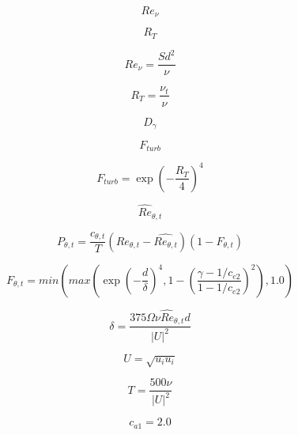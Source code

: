 \begin{equation}
Re_\nu
\end{equation}

\begin{equation}
R_T
\end{equation}

\begin{equation}
Re_\nu  = \frac{S d^2}{\nu}
\end{equation}

\begin{equation}
R_T = \frac{\nu_t}{\nu}
\end{equation}

\begin{equation}
D_\gamma
\end{equation}

\begin{equation}
F_{turb}
\end{equation}

\begin{equation}
F_{turb} = \exp\left(-\frac{R_T}{4}\right)^4
\end{equation}

\begin{equation}
\widehat{Re}_{\theta,t}
\end{equation}

\begin{equation}
P_{\theta,t}  = \frac{c_{\theta,t}}{T} \left( Re_{\theta,t} - \widehat{Re_{\theta,t}} \right) \left(1- F_{\theta,t} \right)
\end{equation}

\begin{equation}
F_{\theta,t} = min \left( 
max \left( \exp\left(-\frac{d}{\delta}\right)^4 ,
1 - \left( \frac{\gamma -1/c_{e2}}{1-1/c_{e2}} \right)^2 \right) , 1.0 \right)
\end{equation}

\begin{equation}
\delta = \frac{375\Omega \nu \widehat{Re}_{\theta,t} d}{\left| U \right|^2}
\end{equation}

\begin{equation}
U = \sqrt{u_i u_i}
\end{equation}

\begin{equation}
T = \frac{500\nu}{\left| U \right|^2}
\end{equation}

\begin{equation}
c_{a1}=2.0
\end{equation}

